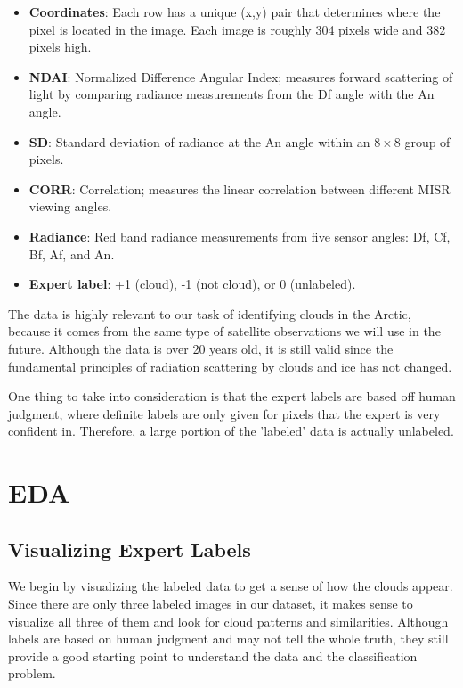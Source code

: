 \documentclass[10pt,letterpaper]{article}
\begin{document}
\begin{itemize}
    \item \textbf{Coordinates}: Each row has a unique (x,y) pair that determines where the pixel is located in the image. Each image is roughly 304 pixels wide and 382 pixels high.
    \item \textbf{NDAI}: Normalized Difference Angular Index; measures forward scattering of light by comparing radiance measurements from the Df angle with the An angle.
    \item \textbf{SD}: Standard deviation of radiance at the An angle within an $8 \times 8$ group of pixels.
    \item \textbf{CORR}: Correlation; measures the linear correlation between different MISR viewing angles.
    \item \textbf{Radiance}: Red band radiance measurements from five sensor angles: Df, Cf, Bf, Af, and An.
    \item \textbf{Expert label}: +1 (cloud), -1 (not cloud), or 0 (unlabeled).
\end{itemize}

The data is highly relevant to our task of identifying clouds in the Arctic, because it comes from the same type of satellite observations we will use in the future. Although the data is over 20 years old, it is still valid since the fundamental principles of radiation scattering by clouds and ice has not changed.

One thing to take into consideration is that the expert labels are based off human judgment, where definite labels are only given for pixels that the expert is very confident in. Therefore, a large portion of the 'labeled' data is actually unlabeled.

\section{EDA}

\subsection{Visualizing Expert Labels}

We begin by visualizing the labeled data to get a sense of how the clouds appear. Since there are only three labeled images in our dataset, it makes sense to visualize all three of them and look for cloud patterns and similarities. Although labels are based on human judgment and may not tell the whole truth, they still provide a good starting point to  understand the data and the classification problem.
\end{document}

